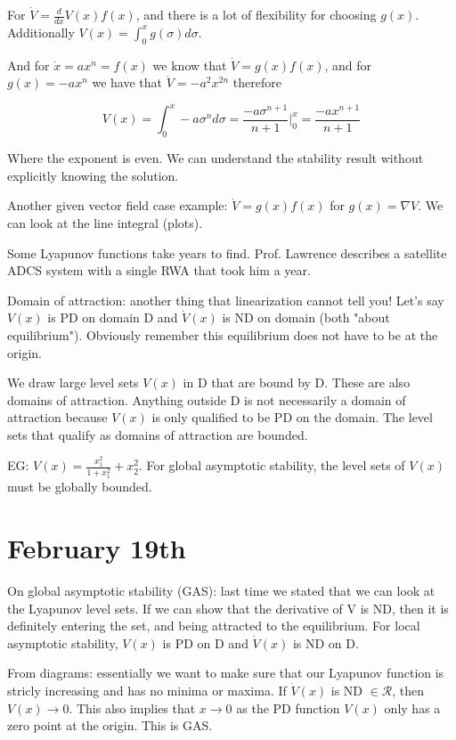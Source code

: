 \documentclass[11pt]{article}
\begin{document}
For $\dot{V} = \frac{d}{dx}V(x)f(x)$, and there is a lot of flexibility for choosing $g(x)$. Additionally $V(x) = \int_0^x g(\sigma)d\sigma$. 

And for $\dot{x} = ax^n = f(x)$ we know that $\dot{V} = g(x)f(x)$, and for $g(x) = -ax^n$ we have that $\dot{V} = -a^2x^{2n}$ therefore 

\begin{equation}
V(x) = \int_0^x -a\sigma^nd\sigma = \frac{-a\sigma^{n+1}}{n+1} \Big \rvert_0^x = \frac{-ax^{n+1}}{n+1}	
\end{equation}

Where the exponent is even. We can understand the stability result without explicitly knowing the solution.

Another given vector field case example: $\dot{V} = g(x)f(x)$ for $g(x) = \nabla V$. We can look at the line integral (plots). 

Some Lyapunov functions take years to find. Prof. Lawrence describes a satellite ADCS system with a single RWA that took him a year.

Domain of attraction: another thing that linearization cannot tell you! Let's say $V(x)$ is PD on domain D and $\dot{V}(x)$ is ND on domain (both "about equilibrium"). Obviously remember this equilibrium does not have to be at the origin.

We draw large level sets $V(x)$ in D that are bound by D. These are also domains of attraction. Anything outside D is not necessarily a domain of attraction because $V(x)$ is only qualified to be PD on the domain. The level sets that qualify as domains of attraction are bounded.

EG: $V(x) = \frac{x_1^2}{1+x_1^2}+x_2^2$. For global asymptotic stability, the level sets of $V(x)$ must be globally bounded.





\section*{February 19th}
On global asymptotic stability (GAS): last time we stated that we can look at the Lyapunov level sets. If we can show that the derivative of V is ND, then it is definitely entering the set, and being attracted to the equilibrium. For local asymptotic stability, $V(x)$ is PD on D and $\dot{V}(x)$ is ND on D.

From  diagrams: essentially we want to make sure that our Lyapunov function is stricly increasing and has no minima or maxima. If $\dot{V}(x)$ is ND $\in \mathcal{R}$, then $V(x) \rightarrow 0$. This also implies that $x\rightarrow 0$ as the PD function $V(x)$ only has a zero point at the origin. This is GAS.
\end{document}
